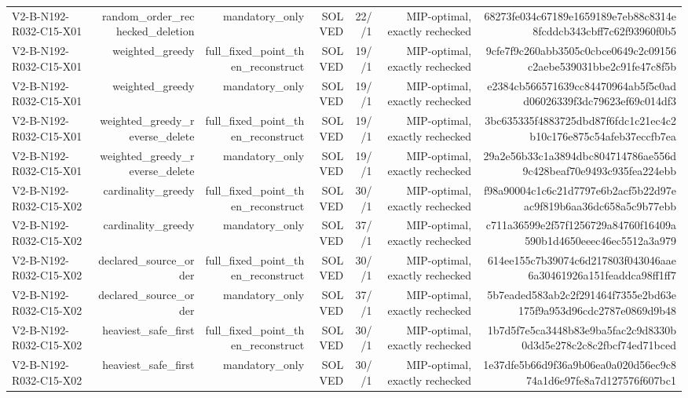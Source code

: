 {\begin{longtable}{lrrrrrr}
V2-B-N192-R032-C15-X01 & random\_order\_rechecked\_deletion & mandatory\_only & SOLVED & 22//1 & MIP-optimal, exactly rechecked & 68273fe034c67189e1659189e7eb88c8314e8fcddcb343cbff7c62f93960f0b5 \\
V2-B-N192-R032-C15-X01 & weighted\_greedy & full\_fixed\_point\_then\_reconstruct & SOLVED & 19//1 & MIP-optimal, exactly rechecked & 9cfe7f9c260abb3505c0cbce0649c2c09156c2aebe539031bbe2c91fe47c8f5b \\
V2-B-N192-R032-C15-X01 & weighted\_greedy & mandatory\_only & SOLVED & 19//1 & MIP-optimal, exactly rechecked & e2384cb566571639cc84470964ab5f5c0add06026339f3dc79623ef69c014df3 \\
V2-B-N192-R032-C15-X01 & weighted\_greedy\_reverse\_delete & full\_fixed\_point\_then\_reconstruct & SOLVED & 19//1 & MIP-optimal, exactly rechecked & 3bc635335f4883725dbd87f6fdc1c21ec4c2b10c176e875c54afeb37eccfb7ea \\
V2-B-N192-R032-C15-X01 & weighted\_greedy\_reverse\_delete & mandatory\_only & SOLVED & 19//1 & MIP-optimal, exactly rechecked & 29a2e56b33c1a3894dbc804714786ae556d9c428beaf70e9493c935fea224ebb \\
V2-B-N192-R032-C15-X02 & cardinality\_greedy & full\_fixed\_point\_then\_reconstruct & SOLVED & 30//1 & MIP-optimal, exactly rechecked & f98a90004c1c6c21d7797e6b2acf5b22d97eac9f819b6aa36dc658a5c9b77ebb \\
V2-B-N192-R032-C15-X02 & cardinality\_greedy & mandatory\_only & SOLVED & 37//1 & MIP-optimal, exactly rechecked & c711a36599e2f57f1256729a84760f16409a590b1d4650eeec46ec5512a3a979 \\
V2-B-N192-R032-C15-X02 & declared\_source\_order & full\_fixed\_point\_then\_reconstruct & SOLVED & 30//1 & MIP-optimal, exactly rechecked & 614ee155c7b39074c6d217803f043046aae6a30461926a151feaddca98ff1ff7 \\
V2-B-N192-R032-C15-X02 & declared\_source\_order & mandatory\_only & SOLVED & 37//1 & MIP-optimal, exactly rechecked & 5b7eaded583ab2c2f291464f7355e2bd63e175f9a953d96cdc2787e0869d9b48 \\
V2-B-N192-R032-C15-X02 & heaviest\_safe\_first & full\_fixed\_point\_then\_reconstruct & SOLVED & 30//1 & MIP-optimal, exactly rechecked & 1b7d5f7e5ca3448b83e9ba5fac2c9d8330b0d3d5e278c2c8c2fbcf74ed71bced \\
V2-B-N192-R032-C15-X02 & heaviest\_safe\_first & mandatory\_only & SOLVED & 30//1 & MIP-optimal, exactly rechecked & 1e37dfe5b66d9f36a9b06ea0a020d56ec9c874a1d6e97fe8a7d127576f607bc1 \\

\end{longtable}}

